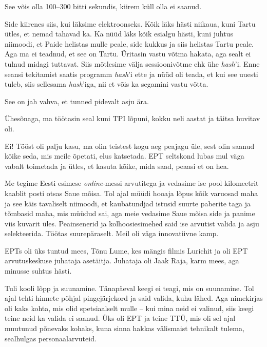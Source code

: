 
See võis olla 100--300 bitti sekundis, kiirem küll olla ei saanud. 

Side kiirenes siis, kui läksime elektroonseks. Kõik läks hästi niikaua, 
kuni Tartu ütles, et nemad tahavad ka. Ka nüüd läks kõik esialgu 
hästi, kuni juhtus niimoodi, et Paide helistas mulle peale, side kukkus ja 
siis helistas Tartu peale. Aga ma ei teadnud, et see on Tartu. Üritasin vastu 
võtma hakata, aga sealt ei tulnud midagi tuttavat. Siis mõtlesime välja sessioonivõtme ehk ühe \emph{hash}'i. Enne seansi
tekitamist saatis programm \emph{hash}'i ette ja nüüd oli teada, et 
kui see uuesti tuleb, siis sellesama \emph{hash}'iga, nii et võis ka segamini 
vastu võtta. 


See on jah vahva, et tunned pidevalt asju ära. 

Ühesõnaga, ma töötasin seal kuni TPI lõpuni, kokku neli aastat ja täitsa huvitav oli.


Ei! Tööst oli palju kasu, ma olin teistest kogu aeg peajagu üle, sest olin 
saanud kõike seda, mis meile õpetati, elus katsetada. EPT seltskond lubas 
mul väga vabalt toimetada ja ütles, et kasuta kõike, mida saad, peaasi 
et on hea. 

Me tegime Eesti esimese \emph{online}-messi 
arvutitega ja vedasime ise pool kilomeetrit kaablit posti otsas Saue mõisa. Tol 
ajal müüdi hooaja lõpus kõik varuosad maha ja see käis tavaliselt 
niimoodi, et kaubatundjad istusid suurte paberite taga ja tõmbasid maha, mis 
müüdud sai, aga meie vedasime Saue mõisa side ja panime viis kuvarit üles. Peainsenerid ja kolhoosiesimehed said ise 
arvutist valida ja asju selekteerida. Töötas suurepäraselt. Meil oli väga innovatiivne 
kamp.

EPTs oli üks tuntud mees, Tõnu Lume, kes mängis filmis 
Lurichit ja 
oli EPT arvutuskeskuse juhataja asetäitja. Juhataja oli Jaak Raja, karm mees, aga minusse suhtus hästi. 


Tuli kooli lõpp ja suunamine. Tänapäeval keegi ei teagi, mis on suunamine. 
Tol ajal tehti hinnete põhjal pingejärjekord ja said valida, kuhu lähed. Aga nimekirjas oli kaks kohta, mis 
olid spetsiaalselt mulle -- kui mina neid ei valinud, siis keegi teine neid 
ka valida ei saanud. Üks oli EPT ja teine TTÜ, mis oli sel 
ajal muutunud põnevaks kohaks, kuna sinna hakkas välismaist
tehnikalt tulema, sealhulgas personaalarvuteid. 

